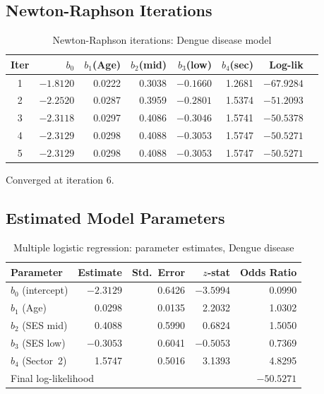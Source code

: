 \documentclass[12pt,a4paper]{article}
\begin{document}
\subsection{Newton-Raphson Iterations}

\begin{table}[H]
\centering
\caption{Newton-Raphson iterations: Dengue disease model}
\footnotesize
\begin{tabular}{crrrrrrr}
\toprule
Iter & $b_0$ & $b_1$(Age) & $b_2$(mid) & $b_3$(low) & $b_4$(sec) & Log-lik \\
\midrule
1 & $-1.8120$ & 0.0222 &  0.3038 & $-0.1660$ & 1.2681 & $-67.9284$ \\
2 & $-2.2520$ & 0.0287 &  0.3959 & $-0.2801$ & 1.5374 & $-51.2093$ \\
3 & $-2.3118$ & 0.0297 &  0.4086 & $-0.3046$ & 1.5741 & $-50.5378$ \\
4 & $-2.3129$ & 0.0298 &  0.4088 & $-0.3053$ & 1.5747 & $-50.5271$ \\
5 & $-2.3129$ & 0.0298 &  0.4088 & $-0.3053$ & 1.5747 & $-50.5271$ \\
\bottomrule
\end{tabular}
\end{table}

Converged at iteration 6.

\subsection{Estimated Model Parameters}

\begin{table}[H]
\centering
\caption{Multiple logistic regression: parameter estimates, Dengue disease}
\begin{tabular}{lrrrr}
\toprule
Parameter & Estimate & Std.\ Error & $z$-stat & Odds Ratio \\
\midrule
$b_0$ (intercept)   & $-2.3129$ & 0.6426 & $-3.5994$ & 0.0990 \\
$b_1$ (Age)         &  0.0298   & 0.0135 &  2.2032   & 1.0302 \\
$b_2$ (SES mid)     &  0.4088   & 0.5990 &  0.6824   & 1.5050 \\
$b_3$ (SES low)     & $-0.3053$ & 0.6041 & $-0.5053$ & 0.7369 \\
$b_4$ (Sector~2)    &  1.5747   & 0.5016 &  3.1393   & 4.8295 \\
\midrule
\multicolumn{3}{l}{Final log-likelihood} & \multicolumn{2}{r}{$-50.5271$} \\
\bottomrule
\end{tabular}
\end{table}
\end{document}
